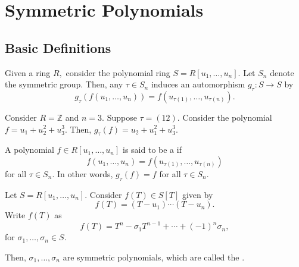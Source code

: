 \chapter{Symmetric Polynomials}
\section{Basic Definitions}

\begin{defn}%
    Given a ring $R,$ consider the polynomial ring $S = R[u_1, \ldots, u_n].$ Let $S_n$ denote the symmetric group. Then, any $\tau \in S_n$ induces an automorphism $g_{\tau} : S \to S$ by
    \begin{equation*} 
        g_{\tau}(f(u_1, \ldots, u_n)) = f(u_{\tau(1)}, \ldots, u_{\tau(n)}).
    \end{equation*}
\end{defn}

\begin{ex}
    Consider $R = \mathbb{Z}$ and $n = 3.$ Suppose $\tau = (12).$ Consider the polynomial $f = u_1 + u_2^2 + u_3^3.$ Then, $g_{\tau}(f) = u_2 + u_1^2 + u_3^3.$
\end{ex}

\begin{defn}%
    A polynomial $f \in R[u_1, \ldots, u_n]$ is said to be a  if 
    \begin{equation*} 
        f(u_1, \ldots, u_n) = f(u_{\tau(1)}, \ldots, u_{\tau(n)})
    \end{equation*} 
    for all $\tau \in S_n.$ In other words, $g_{\tau}(f) = f$ for all $\tau \in S_n.$
\end{defn}

\begin{defn}%
    Let $S = R[u_1, \ldots, u_n].$ Consider $f(T) \in S[T]$ given by
    \begin{equation*} 
        f(T) = (T - u_1) \cdots (T - u_n).
    \end{equation*}
    Write $f(T)$ as 
    \begin{equation*} 
        f(T) = T^n - \sigma_1 T^{n - 1} + \cdots + (-1)^n \sigma_n,
    \end{equation*}
    for $\sigma_1, \ldots, \sigma_n \in S.$

    Then, $\sigma_1, \ldots, \sigma_n$ are symmetric polynomials, which are called the .
\end{defn}

